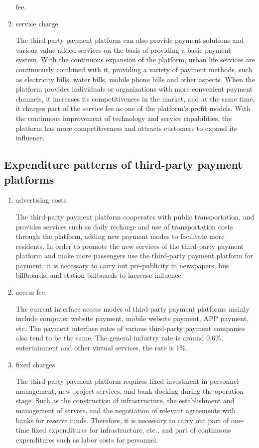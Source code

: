 \documentclass[../mcmpaper]{subfiles}
\begin{document}
\begin{enumerate}[label=\arabic*), itemindent=2\parindent, leftmargin=0pt, topsep=0pt, listparindent=\parindent, itemsep=1pt]
fee.
	\item service charge\par
The third-party payment platform can also provide payment solutions and various value-added services on the basis of providing a basic payment system. With the continuous expansion of the platform, urban life services are continuously combined with it, providing a variety of payment methods, such as electricity bills, water bills, mobile phone bills and other aspects. When the platform provides individuals or organizations with more convenient payment channels, it increases its competitiveness in the market, and at the same time, it charges part of the service fee as one of the platform's profit models. With the continuous improvement of technology and service capabilities, the platform has more competitiveness and attracts customers to expand its influence.
\end{enumerate}
\subsection{Expenditure patterns of third-party payment platforms}
\begin{enumerate}[label=\arabic*), itemindent=2\parindent, leftmargin=0pt, topsep=0pt, listparindent=\parindent, itemsep=1pt]
    \item advertising costs\par
The third-party payment platform cooperates with public transportation, and provides services such as daily recharge and use of transportation costs through the platform, adding new payment modes to facilitate more residents. In order to promote the new services of the third-party payment platform and make more passengers use the third-party payment platform for payment, it is necessary to carry out pre-publicity in newspapers, bus billboards, and station billboards to increase influence.
    \item access fee\par
The current interface access modes of third-party payment platforms mainly include computer website payment, mobile website payment, APP payment, etc. The payment interface rates of various third-party payment companies also tend to be the same. The general industry rate is around 0.6\%, entertainment and other virtual services, the rate is 1\%.
    \item fixed charges\par
The third-party payment platform requires fixed investment in personnel management, new project services, and bank docking during the operation stage. Such as the construction of infrastructure, the establishment and management of servers, and the negotiation of relevant agreements with banks for reserve funds. Therefore, it is necessary to carry out part of one-time fixed expenditures for infrastructure, etc., and part of continuous expenditures such as labor costs for personnel.
\end{enumerate}
\end{document}

